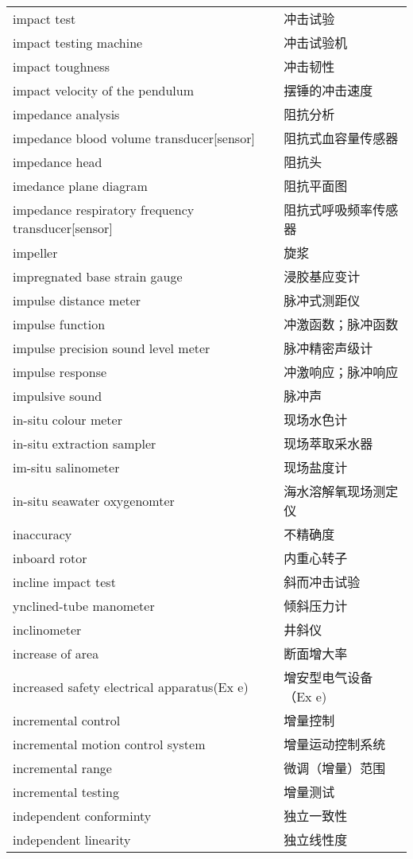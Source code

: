 \documentclass[
]{article}
\begin{document}
\begin{longtable}[]{@{}ll@{}}
impact test & 冲击试验 \\
impact testing machine & 冲击试验机 \\
impact toughness & 冲击韧性 \\
impact velocity of the pendulum & 摆锤的冲击速度 \\
impedance analysis & 阻抗分析 \\
impedance blood volume transducer{[}sensor{]} & 阻抗式血容量传感器 \\
impedance head & 阻抗头 \\
imedance plane diagram & 阻抗平面图 \\
impedance respiratory frequency transducer{[}sensor{]} &
阻抗式呼吸频率传感器 \\
impeller & 旋浆 \\
impregnated base strain gauge & 浸胶基应变计 \\
impulse distance meter & 脉冲式测距仪 \\
impulse function & 冲激函数；脉冲函数 \\
impulse precision sound level meter & 脉冲精密声级计 \\
impulse response & 冲激响应；脉冲响应 \\
impulsive sound & 脉冲声 \\
in-situ colour meter & 现场水色计 \\
in-situ extraction sampler & 现场萃取采水器 \\
im-situ salinometer & 现场盐度计 \\
in-situ seawater oxygenomter & 海水溶解氧现场测定仪 \\
inaccuracy & 不精确度 \\
inboard rotor & 内重心转子 \\
incline impact test & 斜而冲击试验 \\
ynclined-tube manometer & 倾斜压力计 \\
inclinometer & 井斜仪 \\
increase of area & 断面增大率 \\
increased safety electrical apparatus(Ex e) & 增安型电气设备（Ex e) \\
incremental control & 增量控制 \\
incremental motion control system & 增量运动控制系统 \\
incremental range & 微调（增量）范围 \\
incremental testing & 增量测试 \\
independent conforminty & 独立一致性 \\
independent linearity & 独立线性度 \\

\end{longtable}
\end{document}
